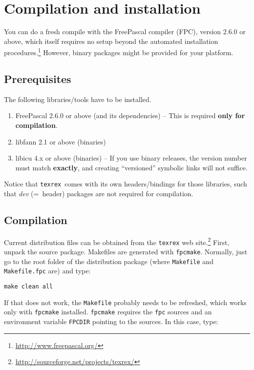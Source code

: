\documentclass[12pt,a4paper]{article}
\newenvironment{bx}
{
  \begin{center}
  \begin{boxedminipage}[h]{0.9\textwidth}
  \small
}
{
  \end{boxedminipage}
  \end{center}
}
\newcommand{\trthis}{\texttt{texrex}}
\begin{document}
\section{Compilation and installation}

You can do a fresh compile with the FreePascal compiler (FPC), version 2.6.0 or above, which itself requires no setup beyond the automated installation procedures.\footnote{\url{http://www.freepascal.org/}}
However, binary packages might be provided for your platform.

\subsection{Prerequisites}

The following libraries/tools have to be installed.

\begin{enumerate}
  \item FreePascal 2.6.0 or above (and its dependencies) -- This is required \textbf{only for compilation}.
  \item libfann 2.1 or above (binaries)
  \item libicu 4.x or above (binaries) -- If you use binary releases, the version number must match \textbf{exactly}, and creating ``versioned'' symbolic links will not suffice.
\end{enumerate}

Notice that \trthis\ comes with its own headers\slash bindings for those libraries, such that \textit{dev} (=~header) packages are not required for compilation.

\subsection{Compilation}

Current distribution files can be obtained from the \texttt{texrex} web site.\footnote{\url{http://sourceforge.net/projects/texrex/}}
First, unpack the source package.
Makefiles are generated with \texttt{fpcmake}.
Normally, just go to the root folder of the distribution package (where \texttt{Makefile} and \texttt{Makefile.fpc} are) and type:

\begin{bx}
\begin{verbatim}
make clean all
\end{verbatim}
\end{bx}

If that does not work, the \texttt{Makefile} probably needs to be refreshed, which works only with \texttt{fpcmake} installed.
\texttt{fpcmake} requires the \texttt{fpc} sources and an environment variable \texttt{FPCDIR} pointing to the sources.
In this case, type:
\end{document}

